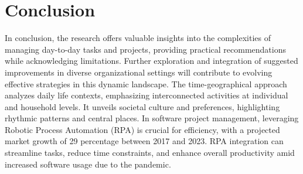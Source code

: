 \documentclass{chart}
\begin{document}
 \section{Conclusion}
\hspace{1cm}In conclusion, the research offers valuable insights into the complexities of managing day-to-day tasks and projects, providing practical recommendations while acknowledging limitations. Further exploration and integration of suggested improvements in diverse organizational settings will contribute to evolving effective strategies in this dynamic landscape. The time-geographical approach analyzes daily life contexts, emphasizing interconnected activities at individual and household levels. It unveils societal culture and preferences, highlighting rhythmic patterns and central places. In software project management, leveraging Robotic Process Automation (RPA) is crucial for efficiency, with a projected market growth of 29 percentage  between 2017 and 2023. RPA integration can streamline tasks, reduce time constraints, and enhance overall productivity amid increased software usage due to the pandemic.
\newpage
 \vspace*{0.5cm}
\end{document}
